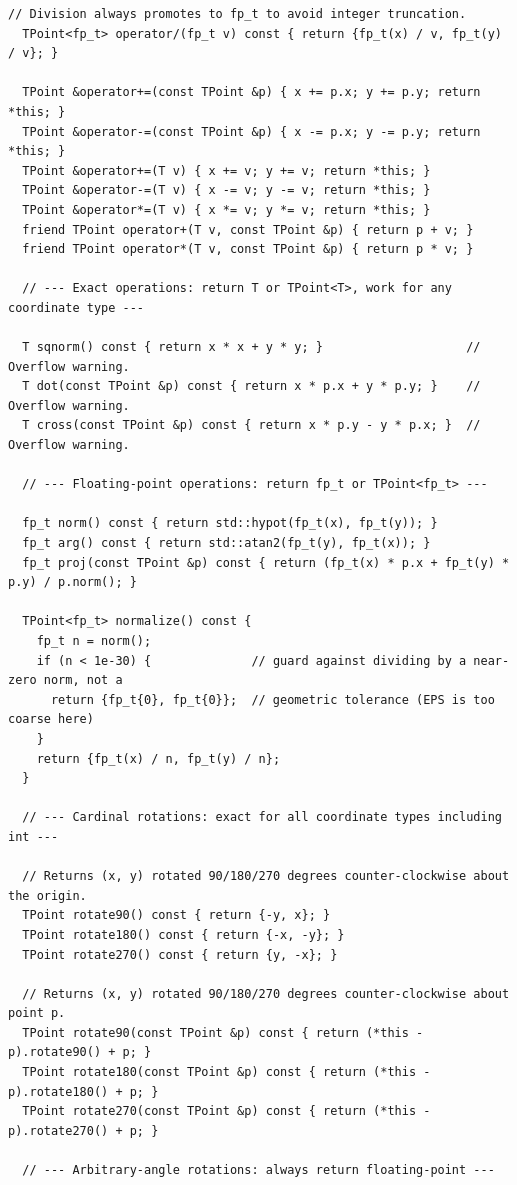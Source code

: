 \begin{lstlisting}[style=cpp]
  // Division always promotes to fp_t to avoid integer truncation.
  TPoint<fp_t> operator/(fp_t v) const { return {fp_t(x) / v, fp_t(y) / v}; }

  TPoint &operator+=(const TPoint &p) { x += p.x; y += p.y; return *this; }
  TPoint &operator-=(const TPoint &p) { x -= p.x; y -= p.y; return *this; }
  TPoint &operator+=(T v) { x += v; y += v; return *this; }
  TPoint &operator-=(T v) { x -= v; y -= v; return *this; }
  TPoint &operator*=(T v) { x *= v; y *= v; return *this; }
  friend TPoint operator+(T v, const TPoint &p) { return p + v; }
  friend TPoint operator*(T v, const TPoint &p) { return p * v; }

  // --- Exact operations: return T or TPoint<T>, work for any coordinate type ---

  T sqnorm() const { return x * x + y * y; }                    // Overflow warning.
  T dot(const TPoint &p) const { return x * p.x + y * p.y; }    // Overflow warning.
  T cross(const TPoint &p) const { return x * p.y - y * p.x; }  // Overflow warning.

  // --- Floating-point operations: return fp_t or TPoint<fp_t> ---

  fp_t norm() const { return std::hypot(fp_t(x), fp_t(y)); }
  fp_t arg() const { return std::atan2(fp_t(y), fp_t(x)); }
  fp_t proj(const TPoint &p) const { return (fp_t(x) * p.x + fp_t(y) * p.y) / p.norm(); }

  TPoint<fp_t> normalize() const {
    fp_t n = norm();
    if (n < 1e-30) {              // guard against dividing by a near-zero norm, not a
      return {fp_t{0}, fp_t{0}};  // geometric tolerance (EPS is too coarse here)
    }
    return {fp_t(x) / n, fp_t(y) / n};
  }

  // --- Cardinal rotations: exact for all coordinate types including int ---

  // Returns (x, y) rotated 90/180/270 degrees counter-clockwise about the origin.
  TPoint rotate90() const { return {-y, x}; }
  TPoint rotate180() const { return {-x, -y}; }
  TPoint rotate270() const { return {y, -x}; }

  // Returns (x, y) rotated 90/180/270 degrees counter-clockwise about point p.
  TPoint rotate90(const TPoint &p) const { return (*this - p).rotate90() + p; }
  TPoint rotate180(const TPoint &p) const { return (*this - p).rotate180() + p; }
  TPoint rotate270(const TPoint &p) const { return (*this - p).rotate270() + p; }

  // --- Arbitrary-angle rotations: always return floating-point ---


\end{lstlisting}
